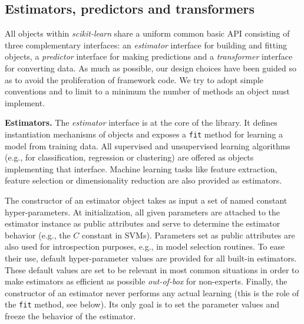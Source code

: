 \documentclass{llncs}
\newcommand{\sklearn}{\textit{scikit-learn}\xspace}
\begin{document}

\subsection{Estimators, predictors and transformers}

All objects within \sklearn share a uniform common basic API
consisting of three complementary interfaces: an \textit{estimator} interface
for building and fitting objects, a \textit{predictor} interface for making
predictions and a \textit{transformer} interface for converting data.
As much as possible, our design choices have been guided so as to avoid
the proliferation of framework code. We try to adopt simple conventions and
to limit to a minimum the number of methods an object must implement.

\textbf{Estimators.} The \textit{estimator} interface is at the core of the
library. It defines instantiation mechanisms of objects and exposes a
\texttt{fit} method for learning a model from training data.  All supervised and
unsupervised learning algorithms (e.g., for classification, regression or
clustering) are offered as objects implementing that interface. Machine
learning tasks like feature extraction, feature selection or dimensionality
reduction are also provided as estimators.

The constructor of an estimator object takes as input a set of named constant
hyper-parameters. At initialization, all given parameters are attached to the
estimator instance as public attributes and serve to determine the estimator
behavior (e.g., the $C$ constant in SVMs). Parameters set as public attributes
are also used for introspection purposes, e.g., in model selection routines. To
ease their use, default hyper-parameter values are provided for all built-in
estimators. These default values are set to be relevant in most common
situations in order to make estimators as efficient as possible
\textit{out-of-box} for non-experts. Finally, the constructor of an estimator
never performs any actual learning (this is the role of the \texttt{fit} method,
see below).  Its only goal is to set the parameter values and freeze the
behavior of the estimator.
\end{document}
